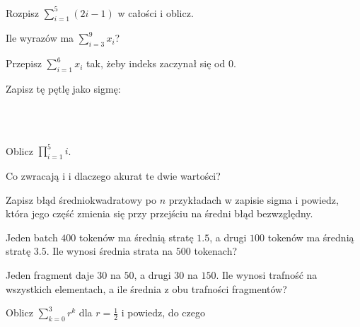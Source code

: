 \canyou

\begin{testexercises}
\item Rozpisz $\sum_{i=1}^{5} (2i - 1)$ w całości i oblicz.
\item Ile wyrazów ma $\sum_{i=3}^{9} x_i$?
\item Przepisz $\sum_{i=1}^{6} x_i$ tak, żeby indeks zaczynał się od $0$.
\item Zapisz tę pętlę jako sigmę:
  \begin{center}
  \\
  \\
  \end{center}
\item Oblicz $\prod_{i=1}^{5} i$.
\item Co zwracają  i  i dlaczego akurat te
  dwie wartości?
\item Zapisz błąd średniokwadratowy po $n$ przykładach w zapisie sigma i
  powiedz, która jego część zmienia się przy przejściu na średni błąd
  bezwzględny.
\item Jeden batch $400$ tokenów ma średnią stratę $\num{1.5}$, a drugi
  $100$ tokenów ma średnią stratę $\num{3.5}$. Ile wynosi średnia strata na
  $500$ tokenach?
\item Jeden fragment daje $30$ na $50$, a drugi $30$ na $150$. Ile wynosi
  trafność na wszystkich elementach, a ile średnia z obu trafności
  fragmentów?
\item Oblicz $\sum_{k=0}^{3} r^{k}$ dla $r = \frac{1}{2}$ i powiedz, do czego

\end{testexercises}

